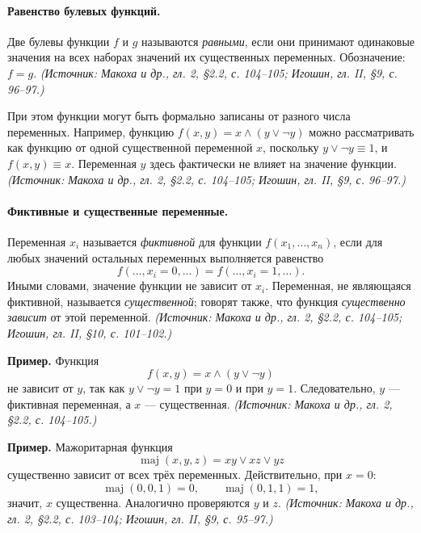 \documentclass[a4paper,12pt]{article}
\begin{document}
\paragraph{Равенство булевых функций.}
Две булевы функции \(f\) и \(g\) называются \emph{равными}, если они принимают одинаковые значения на всех наборах значений их существенных переменных. Обозначение: \(f=g\).
\textit{(Источник: Макоха и др., гл. 2, §2.2, с. 104--105; Игошин, гл. II, §9, с. 96--97.)}

При этом функции могут быть формально записаны от разного числа переменных. Например, функцию \(f(x,y)=x\land(y\lor\neg y)\) можно рассматривать как функцию от одной существенной переменной \(x\), поскольку \(y\lor\neg y\equiv 1\), и \(f(x,y)\equiv x\). Переменная \(y\) здесь фактически не влияет на значение функции.
\textit{(Источник: Макоха и др., гл. 2, §2.2, с. 104--105; Игошин, гл. II, §9, с. 96--97.)}

\paragraph{Фиктивные и существенные переменные.}
Переменная \(x_i\) называется \emph{фиктивной} для функции \(f(x_1,\ldots,x_n)\), если для любых значений остальных переменных выполняется равенство
\[
f(\ldots,x_i=0,\ldots)=f(\ldots,x_i=1,\ldots).
\]
Иными словами, значение функции не зависит от \(x_i\). Переменная, не являющаяся фиктивной, называется \emph{существенной}; говорят также, что функция \emph{существенно зависит} от этой переменной.
\textit{(Источник: Макоха и др., гл. 2, §2.2, с. 104--105; Игошин, гл. II, §10, с. 101--102.)}

\textbf{Пример.} Функция
\[
f(x,y)=x\land(y\lor\neg y)
\]
не зависит от \(y\), так как \(y\lor\neg y=1\) при \(y=0\) и при \(y=1\). Следовательно, \(y\) — фиктивная переменная, а \(x\) — существенная.
\textit{(Источник: Макоха и др., гл. 2, §2.2, с. 104--105.)}

\textbf{Пример.} Мажоритарная функция
\[
\operatorname{maj}(x,y,z)=xy\lor xz\lor yz
\]
существенно зависит от всех трёх переменных. Действительно, при \(x=0\):
\[
\operatorname{maj}(0,0,1)=0,\qquad
\operatorname{maj}(0,1,1)=1,
\]
значит, \(x\) существенна. Аналогично проверяются \(y\) и \(z\).
\textit{(Источник: Макоха и др., гл. 2, §2.2, с. 103--104; Игошин, гл. II, §9, с. 95--97.)}
\end{document}
